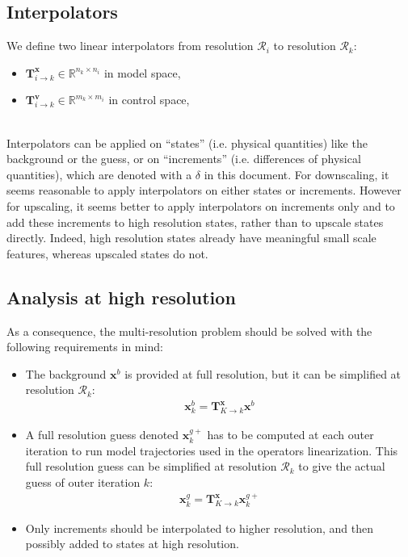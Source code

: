 \documentclass[12pt]{scrartcl}
\begin{document}
\subsection{Interpolators}
We define two linear interpolators from resolution $\mathcal{R}_i$ to resolution $\mathcal{R}_k$:
\begin{itemize}
\item $\mathbf{T}^\mathbf{x}_{i \rightarrow k} \in \mathbb{R}^{n_k \times n_i}$ in model space,
\item $\mathbf{T}^\mathbf{v}_{i \rightarrow k} \in \mathbb{R}^{m_k \times m_i}$ in control space,
\end{itemize}
$  $\\
Interpolators can be applied on ``states'' (i.e. physical quantities) like the background or the guess, or on ``increments'' (i.e. differences of physical quantities), which are denoted with a $\delta$ in this document. For downscaling, it seems reasonable to apply interpolators on either states or increments. However for upscaling, it seems better to apply interpolators on increments only and to add these increments to high resolution states, rather than to upscale states directly. Indeed, high resolution states already have meaningful small scale features, whereas upscaled states do not.

\subsection{Analysis at high resolution}
As a consequence, the multi-resolution problem should be solved with the following requirements in mind:
\begin{itemize}
\item The background $\mathbf{x}^b$ is provided at full resolution, but it can be simplified at resolution $\mathcal{R}_k$:
\begin{align}
\boxed{\mathbf{x}^b_k = \mathbf{T}^\mathbf{x}_{K \rightarrow k} \mathbf{x}^b}
\end{align}
\item A full resolution guess denoted $\mathbf{x}^{g+}_k$ has to be computed at each outer iteration to run model trajectories used in the operators linearization. This full resolution guess can be simplified at resolution $\mathcal{R}_k$ to give the actual guess of outer iteration $k$:
\begin{align}
\boxed{\mathbf{x}^g_k = \mathbf{T}^\mathbf{x}_{K \rightarrow k} \mathbf{x}^{g+}_k}
\end{align}
\item Only increments should be interpolated to higher resolution, and then possibly added to states at high resolution.
\end{itemize}
\end{document}
